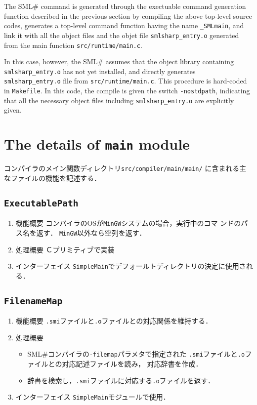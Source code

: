 \documentclass{jbook}
\newif\ifjp
\newcommand{\txt}[2]{#2}
\newcommand{\smlsharp}{SML\#}
\newcommand{\code}[1]{\mbox{\large\tt #1}}
\begin{document}
	The \smlsharp{} command is generated through the 
exectuable command generation function described in the previous section
by compiling the above top-level source codes, generates a top-level
command function having the name \code{\_SMLmain}, and link it with all
the object files and the objet file \code{smlsharp\_entry.o} generated 
from the main function \code{src/runtime/main.c}.

	In this case, however, the \smlsharp{} assumes that the object
library containing \code{smlsharp\_entry.o} has not yet installed, 
and directly generates \code{smlsharp\_entry.o} file from 
\code{src/runtime/main.c}.
	This procedure is hard-coded in \code{Makefile}.
	In this code, the compile is given the switch \code{-nostdpath},
indicating that all the necessary object files including 
\code{smlsharp\_entry.o} are explicitly given.
\fi%

\section{\txt{\code{main}モジュールの詳細}{The details of \code{main} module}}

\ifjp%
	コンパイラのメイン関数ディレクトリ\code{src/compiler/main/main/}
に含まれる主なファイルの機能を記述する．

\subsection{\code{ExecutablePath}}
\begin{enumerate}
\item 機能概要 コンパイラのOSが\code{MinGW}システムの場合，実行中のコマ
ンドのパス名を返す．
	\code{MinGW}以外なら空列を返す．
\item 処理概要 Ｃプリミティブで実装
\item インターフェイス \code{SimpleMain}でデフォールトディレクトリの決定に使用される．
\end{enumerate}
	
\subsection{\code{FilenameMap}}
\begin{enumerate}
\item 機能概要 \code{.smi}ファイルと\code{.o}ファイルとの対応関係を維持する．
\item 処理概要 
\begin{itemize}
\item \smlsharp{}コンパイラの\code{-filemap}パラメタで指定された
\code{.smi}ファイルと\code{.o}ファイルとの対応記述ファイルを読み，
対応辞書を作成．
\item 辞書を検索し，\code{.smi}ファイルに対応する\code{.o}ファイルを返す．
\end{itemize}
\item インターフェイス \code{SimpleMain}モジュールで使用．
\end{enumerate}
\end{document}
